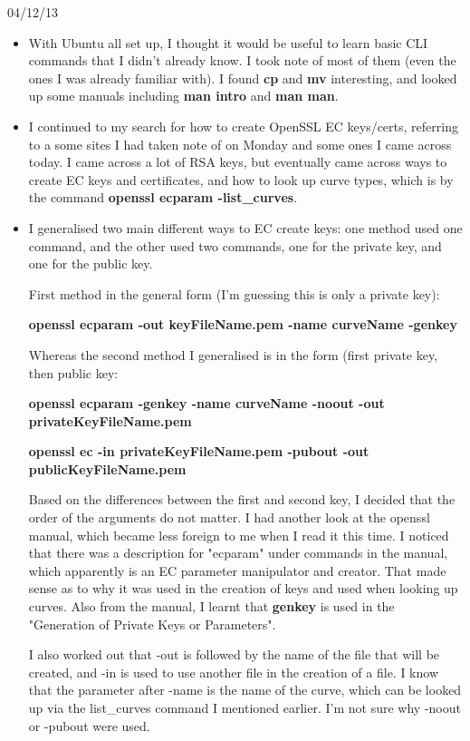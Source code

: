 \documentclass[a4paper, 10pt, envcountsect, runningheads]{article}
\begin{document}
04/12/13 
\begin{itemize}
\item With Ubuntu all set up, I thought it would be useful to learn basic CLI commands that I didn't already know. I took note of most of them (even the ones I was already familiar with). I found \textbf{cp} and \textbf{mv} interesting, and looked up some manuals including \textbf{man intro} and \textbf{man man}.
\item I continued to my search for how to create OpenSSL EC keys/certs, referring to a some sites I had taken note of on Monday and some ones I came across today. I came across a lot of RSA keys, but eventually came across ways to create EC keys and certificates, and how to look up curve types, which is by the command \textbf{openssl ecparam -list\_curves}.
\item I generalised two main different ways to EC create keys: one method used one command, and the other used two commands, one for the private key, and one for the public key. 

First method in the general form (I'm guessing this is only a private key):

\color{DarkOrchid}\textbf{openssl ecparam -out keyFileName.pem -name curveName -genkey}

\color{black}Whereas the second method I generalised is in the form (first private key, then public key:

\color{DarkOrchid}\textbf{openssl ecparam -genkey -name curveName -noout -out privateKeyFileName.pem}

\textbf{openssl ec -in privateKeyFileName.pem -pubout -out publicKeyFileName.pem}

\color{black} Based on the differences between the first and second key, I decided that the order of the arguments do not matter. I had another look at the openssl manual, which became less foreign to me when I read it this time. I noticed that there was a description for "ecparam" under commands in the manual, which apparently is an EC parameter manipulator and creator. That made sense as to why it was used in the creation of keys and used when looking up curves. Also from the manual, I learnt that \textbf{genkey} is used in the "Generation of Private Keys or Parameters".

I also worked out that -out is followed by the name of the file that will be created, and -in is used to use another file in the creation of a file. I know that the parameter after -name is the name of the curve, which can be looked up via the list\_curves command I mentioned earlier. I'm not sure why -noout or -pubout were used.


\end{itemize}
\end{document}
